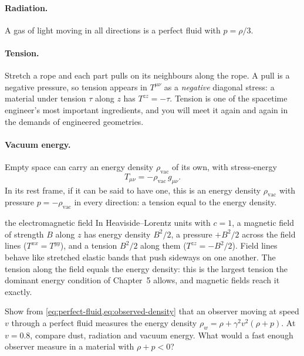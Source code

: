 \paragraph{Radiation.} A gas of light moving in all directions is a perfect
fluid with $p = \rho/3$.

\paragraph{Tension.} Stretch a rope and each part pulls on its neighbours along
the rope. A pull is a negative pressure, so tension appears in $T^{\mu\nu}$ as a
\emph{negative} diagonal stress: a material under tension $\tau$ along $z$ has
$T^{zz} = -\tau$. Tension is one of the spacetime engineer's most important
ingredients, and you will meet it again and again in the demands of engineered
geometries.

\paragraph{Vacuum energy.} Empty space can carry an energy density
$\rho_{\text{vac}}$ of its own, with stress-energy
\begin{equation}
  T_{\mu\nu} = -\rho_{\text{vac}}\,g_{\mu\nu}.
  \label{eq:vacuum-energy}
\end{equation}
In its rest frame, if it can be said to have one, this is an energy density
$\rho_{\text{vac}}$ with pressure $p = -\rho_{\text{vac}}$ in every direction: a
tension equal to the energy density.

\begin{deeper}{the electromagnetic field}
In Heaviside--Lorentz units with $c = 1$, a magnetic field of strength $B$
along $z$ has energy density $B^{2}/2$, a pressure $+B^{2}/2$ across the field
lines ($T^{xx} = T^{yy}$), and a tension $B^{2}/2$ along them
($T^{zz} = -B^{2}/2$). Field lines behave like stretched elastic bands that
push sideways on one another. The tension along the field equals the energy
density: this is the largest tension the dominant energy condition of
Chapter~5 allows, and magnetic fields reach it exactly.
\end{deeper}

\begin{checkpoint}[label=chk:rho-p]
Show from \cref{eq:perfect-fluid,eq:observed-density} that an observer moving
at speed $v$ through a perfect fluid measures the energy density
$\rho_{w} = \rho + \gamma^{2}v^{2}(\rho + p)$. At $v = 0.8$, compare dust,
radiation and vacuum energy. What would a fast enough observer measure in a
material with $\rho + p < 0$?
\end{checkpoint}

